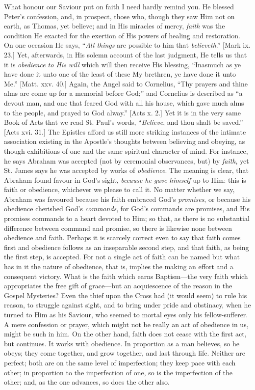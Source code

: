 What honour our Saviour put on faith I need hardly remind you. He
blessed Peter's confession, and, in prospect, those who, though they
saw Him not on earth, as Thomas, yet believe; and in His miracles of
mercy, \emph{faith} was the condition He exacted for the exertion of
His powers of healing and restoration. On one occasion He says, ``\emph{All
things} are possible to him that \emph{believeth}.'' [Mark ix.
23.] Yet, afterwards, in His solemn account of the last judgment, He
tells us that it is \emph{obedience to His will} which will then
receive His blessing, ``Inasmuch as ye have done it unto one of
the least of these My brethren, ye have done it unto Me.'' [Matt.
xxv. 40.] Again, the Angel said to Cornelius, ``Thy prayers and
thine alms are come up for a memorial before God;'' and Cornelius
is described as ``a devout man, and one that feared God with all
his house, which gave much alms to the people, and prayed to God alway.''
[Acts x. 2.] Yet it is in the very same Book of Acts that we read St.
Paul's words, ``\emph{Believe}, and thou shalt be saved.''
[Acts xvi. 31.] The Epistles afford us still more striking instances
of the intimate association existing in the Apostle's thoughts
between believing and obeying, as though exhibitions of one and the
same spiritual character of mind. For instance, he says Abraham was
accepted (not by ceremonial observances, but) by \emph{faith}, yet St.
James says he was accepted by works of \emph{obedience}. The meaning
is clear, that Abraham found favour in God's sight, \emph{because he
gave himself} up to Him: this is faith or obedience, whichever we
please to call it. No matter whether we say, Abraham was favoured
because his faith embraced God's \emph{promises}, or because his
obedience cherished God's \emph{commands}, for God's commands are
promises, and His promises commands to a heart devoted to Him; so
that, as there is no substantial difference between command and
promise, so there is likewise none between obedience and faith.
Perhaps it is scarcely correct even to say that faith comes first and
obedience follows as an inseparable second step, and that faith, as
being the first step, is accepted. For not a single act of faith can
be named but what has in it the nature of obedience, that is, implies
the making an effort and a consequent victory. What is the faith which
earns Baptism—the very faith which appropriates the free gift of
grace—but an acquiescence of the reason in the Gospel Mysteries?
Even the thief upon the Cross had (it would seem) to rule his reason,
to struggle against sight, and to bring under pride and obstinacy,
when he turned to Him as his Saviour, who seemed to mortal eyes only
his fellow-sufferer. A mere confession or prayer, which might not be
really an act of obedience in us, might be such in him. On the other
hand, faith does not cease with the first act, but continues. It works
with obedience. In proportion as a man believes, so he obeys; they
come together, and grow together, and last through life. Neither are
perfect; both are on the same level of imperfection; they keep pace
with each other; in proportion to the imperfection of one, so is the
imperfection of the other; and, as the one advances, so does the other
also.

